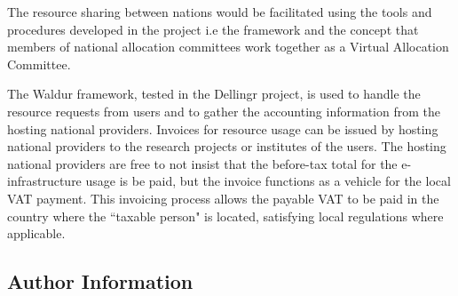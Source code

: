 \documentclass{article}
\newcommand{\einfra}{e-infrastructure\xspace}
\newcommand{\np}{national provider\xspace}
\newcommand{\nps}{\np{s}\xspace}
\begin{document}
\begin{itemize}
The resource sharing between nations would be facilitated using the tools and procedures developed in the project i.e the {} framework and the concept that members of national allocation committees work together as a Virtual Allocation Committee.

The Waldur framework, tested in the Dellingr project, is used to handle the resource requests from users and to gather the accounting information from the hosting \nps.
Invoices for resource usage can be issued by hosting \nps to the research projects or institutes of the users.
The hosting \nps are free to not insist that the before-tax total for the \einfra usage is be paid, but the invoice functions as a vehicle for the local VAT payment.
This invoicing process allows the payable VAT to be paid in the country where the ``taxable person" is located, satisfying local regulations where applicable.

\end{itemize}

\newpage
{}


\newpage
\begin{appendices}
\newpage
\section{Author Information}
\label{app:authors}


\end{appendices}
\end{document}
